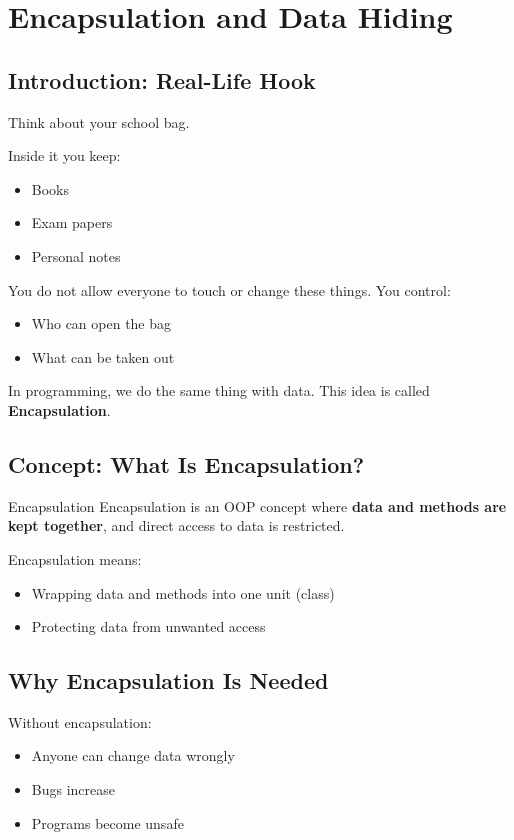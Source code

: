 \chapter{Encapsulation and Data Hiding}

\section{Introduction: Real-Life Hook}

Think about your school bag.

Inside it you keep:
\begin{itemize}
    \item Books
    \item Exam papers
    \item Personal notes
\end{itemize}

You do not allow everyone to touch or change these things.
You control:
\begin{itemize}
    \item Who can open the bag
    \item What can be taken out
\end{itemize}

In programming, we do the same thing with data.
This idea is called \textbf{Encapsulation}.

\section{Concept: What Is Encapsulation?}

\begin{definition}{Encapsulation}
Encapsulation is an OOP concept where \textbf{data and methods are kept together}, and direct access to data is restricted.
\end{definition}

Encapsulation means:
\begin{itemize}
    \item Wrapping data and methods into one unit (class)
    \item Protecting data from unwanted access
\end{itemize}

\section{Why Encapsulation Is Needed}

Without encapsulation:
\begin{itemize}
    \item Anyone can change data wrongly
    \item Bugs increase
    \item Programs become unsafe
\end{itemize}

